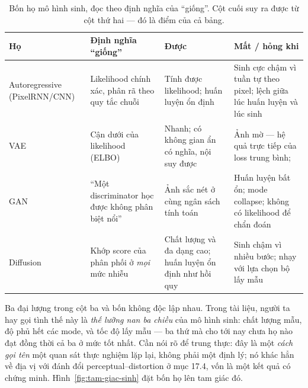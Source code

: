 \documentclass[../../../deep_learning.tex]{subfiles}
\begin{document}
\begin{table}[H]\centering\small
\caption{Bốn họ mô hình sinh, đọc theo định nghĩa của ``giống''. Cột cuối suy ra được từ cột thứ hai --- đó là điểm của cả bảng.}
\label{tab:bon-ho-sinh}
\begin{tabularx}{\linewidth}{@{}L{2.15cm}YYY@{}}
\toprule
\textbf{Họ} & \textbf{Định nghĩa ``giống''} & \textbf{Được} & \textbf{Mất / hỏng khi}\\
\midrule
Auto\-regressive (PixelRNN/CNN) & Likelihood chính xác, phân rã theo quy tắc chuỗi & Tính được likelihood; huấn luyện ổn định & Sinh cực chậm vì tuần tự theo pixel; lệch giữa lúc huấn luyện và lúc sinh\\
VAE & Cận dưới của likelihood (ELBO) & Nhanh; có không gian ẩn có nghĩa, nội suy được & Ảnh mờ --- hệ quả trực tiếp của loss trung bình; \\
GAN & ``Một discriminator học được không phân biệt nổi'' & Ảnh sắc nét ở cùng ngân sách tính toán & Huấn luyện bất ổn; mode collapse; không có likelihood để chẩn đoán\\
Diffusion & Khớp score của phân phối ở \emph{mọi} mức nhiễu & Chất lượng và đa dạng cao; huấn luyện ổn định như hồi quy & Sinh chậm vì nhiều bước; nhạy với lựa chọn bộ lấy mẫu\\
\bottomrule
\end{tabularx}
\end{table}

Ba đại lượng trong cột ba và bốn không độc lập nhau. Trong tài liệu, người ta hay gọi tình thế này là \emph{thế lưỡng nan ba chiều} của mô hình sinh: chất lượng mẫu, độ phủ hết các mode, và tốc độ lấy mẫu --- ba thứ mà cho tới nay chưa họ nào đạt đồng thời cả ba ở mức tốt nhất. Cần nói rõ để trung thực: đây là một \emph{cách gọi tên} một quan sát thực nghiệm lặp lại, không phải một định lý; nó khác hẳn về địa vị với đánh đổi perceptual--distortion ở mục 17.4, vốn là một kết quả có chứng minh. Hình~\ref{fig:tam-giac-sinh} đặt bốn họ lên tam giác đó.
\end{document}
